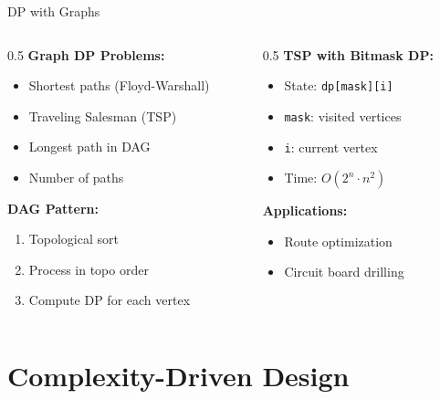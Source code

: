 \documentclass[aspectratio=169,xcolor=dvipsnames]{beamer}
\begin{document}
\begin{frame}{DP with Graphs}
  \begin{columns}
    \begin{column}{0.5\textwidth}
      \textbf{Graph DP Problems:}
      \begin{itemize}
        \item Shortest paths (Floyd-Warshall)
        \item Traveling Salesman (TSP)
        \item Longest path in DAG
        \item Number of paths
      \end{itemize}

      \vspace{0.3cm}
      \textbf{DAG Pattern:}
      \begin{enumerate}
        \item Topological sort
        \item Process in topo order
        \item Compute DP for each vertex
      \end{enumerate}
    \end{column}

    \begin{column}{0.5\textwidth}
      \textbf{TSP with Bitmask DP:}
      \begin{itemize}
        \item State: \texttt{dp[mask][i]}
        \item \texttt{mask}: visited vertices
        \item \texttt{i}: current vertex
        \item Time: $O(2^n \cdot n^2)$
      \end{itemize}

      \vspace{0.3cm}
      \textbf{Applications:}
      \begin{itemize}
        \item Route optimization
        \item Circuit board drilling
      \end{itemize}
    \end{column}
  \end{columns}
\end{frame}

\section{Complexity-Driven Design}
\end{document}
